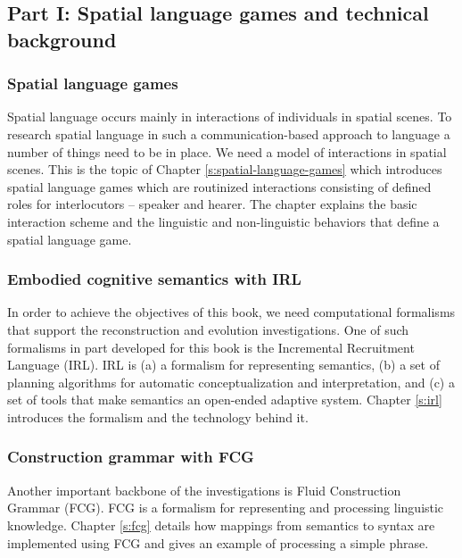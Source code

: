 \subsection{Part I: Spatial language games and technical background}
\subsubsection{Spatial language games}
Spatial language occurs mainly in interactions of individuals in spatial scenes.
To research spatial language in such a communication-based approach
to language a number of things need to be in place. We need a model of 
interactions in spatial scenes. This is the topic of Chapter \ref{s:spatial-language-games} which 
introduces spatial language games which are routinized interactions
consisting of defined roles for interlocutors -- speaker and hearer. 
The chapter explains the basic interaction scheme and the 
linguistic and non-linguistic behaviors that define a spatial language
game. 

\subsubsection{Embodied cognitive semantics with IRL}
In order to achieve the objectives of this book, we need computational 
formalisms that support the reconstruction and evolution investigations. 
One of such formalisms in part developed for this book is the 
Incremental Recruitment Language (IRL). IRL is (a) a formalism
for representing semantics, (b) a set of planning algorithms for automatic
conceptualization and interpretation, and (c) a set of tools that make
semantics an open-ended adaptive system. Chapter \ref{s:irl} 
introduces the formalism and the technology behind it.

\subsubsection{Construction grammar with FCG}
Another important backbone of the investigations is Fluid Construction 
Grammar (FCG). FCG is a formalism for representing and processing linguistic 
knowledge. Chapter \ref{s:fcg} details how mappings from semantics to syntax 
are implemented using FCG and gives an example of processing a simple phrase.

